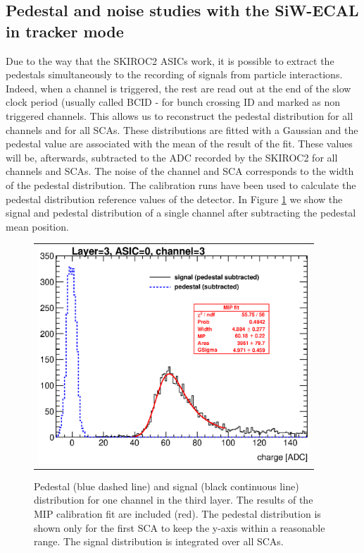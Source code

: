 \documentclass[a4paper,11pt]{article}
\begin{document}
\subsection{Pedestal and noise studies with the SiW-ECAL in tracker mode}
\label{sec:pedestal}

Due to the way that the SKIROC2 ASICs work, it is possible to extract the pedestals
simultaneously to the recording of signals from particle interactions. Indeed, when a channel
is triggered, the rest are read out at the end of the slow clock period (usually called BCID - for bunch crossing ID  and marked as
non triggered channels. This allows us to reconstruct the pedestal distribution
for all channels and for all SCAs. These distributions are fitted with a Gaussian
and the pedestal value are associated with the mean of the result of the fit.
These values will be, afterwards, subtracted to the ADC recorded by the SKIROC2 for all channels and SCAs.
The noise of the channel and SCA corresponds to the width of the pedestal distribution.
The calibration runs have been used to calculate the pedestal distribution reference values of the detector.
In Figure \ref{signal_pedestal} we show the signal and pedestal distribution of a single channel after
subtracting the pedestal mean position.

\begin{figure}[!t]
  \centering
  \begin{tabular}{l}
    \includegraphics[width=4in]{figs/mip_pedestal_example.eps}
  \end{tabular}
  \caption{Pedestal (blue dashed line) and signal (black continuous line) distribution for one channel in the third layer. The results of the MIP calibration fit are included (red). The pedestal distribution is shown only for the first SCA to keep the y-axis within a reasonable range. The signal distribution is integrated over all SCAs.}
\label{signal_pedestal}
\end{figure}
\end{document}
